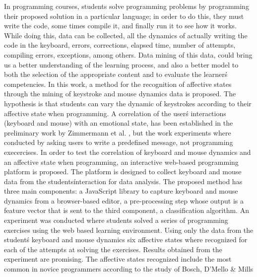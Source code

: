 \documentclass[a4paper,twoside]{article}
\begin{document}
In programming courses, students solve programming problems by programming their
proposed solution in a particular language; in order to do this, they must write the code,
some times compile it, and finally run it to see how it works. 
While doing this, data can be collected, all the dynamics of actually writing 
the code in the keyboard, errors, corrections, elapsed time, number of attempts,
compiling errors, exceptions, among others. Data mining of this data, could
bring us a better understanding of the learning process, and also a better model to 
both the selection of the appropriate content and to evaluate the learner\'s competencies.
In this work, a method for the recognition of affective states through the
mining of keystroke and mouse dynamics data is proposed. 
The hypothesis is that students can vary the dynamic of keystrokes according 
to their affective state when programming. A correlation of the 
user\'s interactions (keyboard and mouse) with an emotional state, has been 
established in the preliminary work by Zimmermann
et al. \cite{zimmermann2003affective}, but the work experiments where
conducted by asking users to write a predefined message, not programming
execercises. 
In order to test the correlation of keyboard and mouse dynamics and an
affective state when programming, an interactive web-based 
programming platform is proposed. The platform is designed to collect
keyboard and mouse data from the students\' interaction for data analysis.
The proposed method has three main components: a JavaScript library to capture keyboard and mouse
dynamics from a browser-based editor, a pre-processing step whose output is a
feature vector that is sent to the third component, a classification algorithm.
An experiment was conducted where students solved a series of programming
exercises using the web based learning environment. Using only the data from the
student\'s keyboard and mouse dynamics six affective states where recognized for
each of the attempts at solving the exercises. Results obtained from the
experiment are promising. The affective states recognized include the most
common in novice programmers according to the study of Bosch, D'Mello \& Mills
\end{document}
